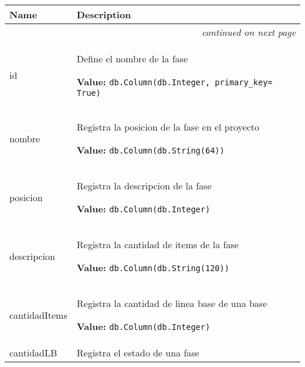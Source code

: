     \vspace{-1cm}
\hspace{\varindent}\begin{longtable}{|p{\varnamewidth}|p{\vardescrwidth}|l}
\cline{1-2}
\cline{1-2} \centering \textbf{Name} & \centering \textbf{Description}& \\
\cline{1-2}
\endhead\cline{1-2}\multicolumn{3}{r}{\small\textit{continued on next page}}\\\endfoot\cline{1-2}
\endlastfoot\raggedright i\-d\- & \raggedright Define el nombre de la fase

\textbf{Value:} 
{\tt db.Column(db.Integer, primary\_key= True)}&\\
\cline{1-2}
\raggedright n\-o\-m\-b\-r\-e\- & \raggedright Registra la posicion de la fase en el proyecto

\textbf{Value:} 
{\tt db.Column(db.String(64))}&\\
\cline{1-2}
\raggedright p\-o\-s\-i\-c\-i\-o\-n\- & \raggedright Registra la descripcion de la fase

\textbf{Value:} 
{\tt db.Column(db.Integer)}&\\
\cline{1-2}
\raggedright d\-e\-s\-c\-r\-i\-p\-c\-i\-o\-n\- & \raggedright Registra la cantidad de items de la fase

\textbf{Value:} 
{\tt db.Column(db.String(120))}&\\
\cline{1-2}
\raggedright c\-a\-n\-t\-i\-d\-a\-d\-I\-t\-e\-m\-s\- & \raggedright Registra la cantidad de linea base de una base

\textbf{Value:} 
{\tt db.Column(db.Integer)}&\\
\cline{1-2}
\raggedright c\-a\-n\-t\-i\-d\-a\-d\-L\-B\- & \raggedright Registra el estado de una fase


\end{longtable}
